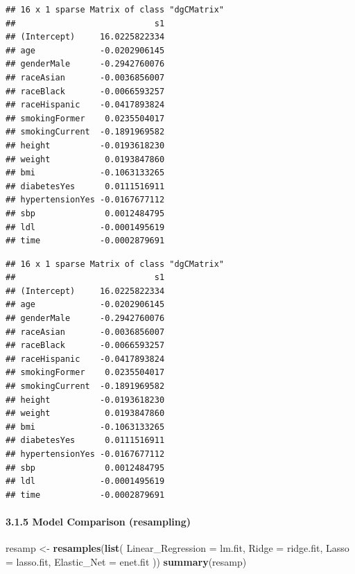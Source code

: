 \documentclass[
]{article}
\newenvironment{Shaded}{\begin{snugshade}}{\end{snugshade}}
\newcommand{\AttributeTok}[1]{\textcolor[rgb]{0.13,0.29,0.53}{#1}}
\newcommand{\FunctionTok}[1]{\textcolor[rgb]{0.13,0.29,0.53}{\textbf{#1}}}
\newcommand{\NormalTok}[1]{#1}
\newcommand{\OtherTok}[1]{\textcolor[rgb]{0.56,0.35,0.01}{#1}}
\newcommand{\SpecialCharTok}[1]{\textcolor[rgb]{0.81,0.36,0.00}{\textbf{#1}}}
\begin{document}
\begin{verbatim}
## 16 x 1 sparse Matrix of class "dgCMatrix"
##                            s1
## (Intercept)     16.0225822334
## age             -0.0202906145
## genderMale      -0.2942760076
## raceAsian       -0.0036856007
## raceBlack       -0.0066593257
## raceHispanic    -0.0417893824
## smokingFormer    0.0235504017
## smokingCurrent  -0.1891969582
## height          -0.0193618230
## weight           0.0193847860
## bmi             -0.1063133265
## diabetesYes      0.0111516911
## hypertensionYes -0.0167677112
## sbp              0.0012484795
## ldl             -0.0001495619
## time            -0.0002879691
\end{verbatim}

\begin{Shaded}
\end{Shaded}

\begin{verbatim}
## 16 x 1 sparse Matrix of class "dgCMatrix"
##                            s1
## (Intercept)     16.0225822334
## age             -0.0202906145
## genderMale      -0.2942760076
## raceAsian       -0.0036856007
## raceBlack       -0.0066593257
## raceHispanic    -0.0417893824
## smokingFormer    0.0235504017
## smokingCurrent  -0.1891969582
## height          -0.0193618230
## weight           0.0193847860
## bmi             -0.1063133265
## diabetesYes      0.0111516911
## hypertensionYes -0.0167677112
## sbp              0.0012484795
## ldl             -0.0001495619
## time            -0.0002879691
\end{verbatim}

\paragraph{3.1.5 Model Comparison
(resampling)}\label{model-comparison-resampling}

\begin{Shaded}
\begin{Highlighting}[]
\NormalTok{resamp }\OtherTok{\textless{}{-}} \FunctionTok{resamples}\NormalTok{(}\FunctionTok{list}\NormalTok{(}
  \AttributeTok{Linear\_Regression =}\NormalTok{ lm.fit,}
  \AttributeTok{Ridge =}\NormalTok{ ridge.fit, }
  \AttributeTok{Lasso =}\NormalTok{ lasso.fit,}
  \AttributeTok{Elastic\_Net =}\NormalTok{ enet.fit}
\NormalTok{))}
\FunctionTok{summary}\NormalTok{(resamp)}
\end{Highlighting}
\end{Shaded}
\end{document}
